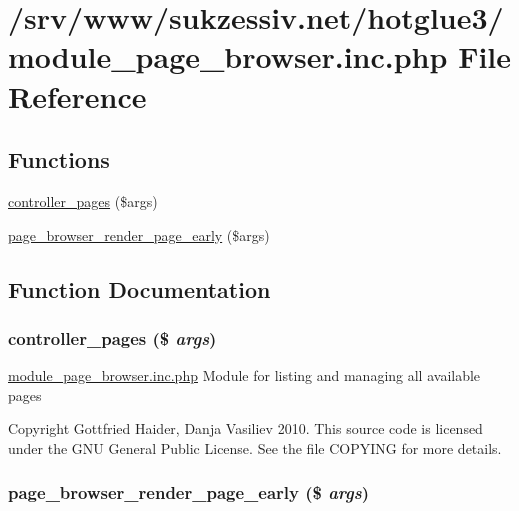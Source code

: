 \hypertarget{module__page__browser_8inc_8php}{
\section{/srv/www/sukzessiv.net/hotglue3/module\_\-page\_\-browser.inc.php File Reference}
\label{module__page__browser_8inc_8php}
}
\subsection*{Functions}
\begin{CompactItemize}
\item 
\hyperlink{module__page__browser_8inc_8php_7e937f92734b69829f9d3ab5e00f14e0}{controller\_\-pages} (\$args)
\item 
\hyperlink{module__page__browser_8inc_8php_a94d17bbea100ee50f09c7bf4094a1db}{page\_\-browser\_\-render\_\-page\_\-early} (\$args)
\end{CompactItemize}


\subsection{Function Documentation}
\hypertarget{module__page__browser_8inc_8php_7e937f92734b69829f9d3ab5e00f14e0}{
\subsubsection[{controller\_\-pages}]{\setlength{\rightskip}{0pt plus 5cm}controller\_\-pages (\$ {\em args})}}
\label{module__page__browser_8inc_8php_7e937f92734b69829f9d3ab5e00f14e0}


\hyperlink{module__page__browser_8inc_8php}{module\_\-page\_\-browser.inc.php} Module for listing and managing all available pages

Copyright Gottfried Haider, Danja Vasiliev 2010. This source code is licensed under the GNU General Public License. See the file COPYING for more details. \hypertarget{module__page__browser_8inc_8php_a94d17bbea100ee50f09c7bf4094a1db}{
\subsubsection[{page\_\-browser\_\-render\_\-page\_\-early}]{\setlength{\rightskip}{0pt plus 5cm}page\_\-browser\_\-render\_\-page\_\-early (\$ {\em args})}}
\label{module__page__browser_8inc_8php_a94d17bbea100ee50f09c7bf4094a1db}


